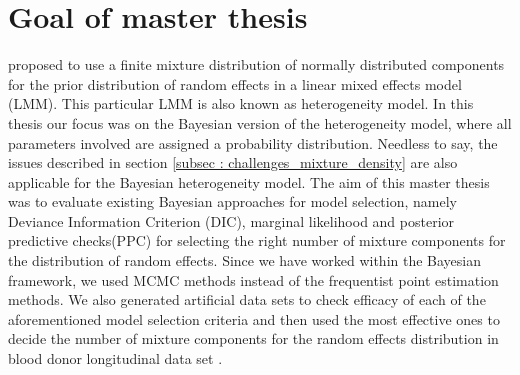\section{Goal of master thesis}
\label{sec : goal}
\citet*{verbeke_linear_1996} proposed to use a finite mixture distribution of normally distributed components for the prior distribution of random effects in a linear mixed effects model (LMM). This particular LMM is also known as heterogeneity model. In this thesis our focus was on the Bayesian version of the heterogeneity model, where all parameters involved are assigned a probability distribution. Needless to say, the issues described in section \ref{subsec : challenges_mixture_density} are also applicable for the Bayesian heterogeneity model. The aim of this master thesis was to evaluate existing Bayesian approaches for model selection, namely Deviance Information Criterion (DIC), marginal likelihood and posterior predictive checks(PPC) for selecting the right number of mixture components for the distribution of random effects. Since we have worked within the Bayesian framework, we used MCMC methods instead of the frequentist point estimation methods. We also generated artificial data sets to check efficacy of each of the aforementioned model selection criteria and then used the most effective ones to decide the number of mixture components for the random effects distribution in blood donor longitudinal data set \citep{nasserinejad_prevalence_2015}.